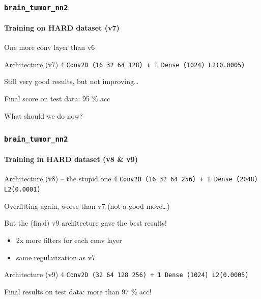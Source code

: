 \documentclass[]{beamer}
\newcommand{\btnt}{\tt{brain\_tumor\_nn2}}
\begin{document}
\begin{frame}
  \frametitle{\btnt}
  \framesubtitle{Training on HARD dataset (v7)}

  One more conv layer than v6

  \begin{exampleblock}{Architecture (v7)}
    4 \tt{Conv2D} (16 32 64 128) + 1 \tt{Dense} (1024) \hfill \alert{L2(0.0005)}
  \end{exampleblock}

  Still very good results, but not improving\ldots{}

  \medskip

  Final score on test data: \alert{95 \% acc}

  \bigskip

  What should we do now?
\end{frame}

\begin{frame}
  \frametitle{\btnt}
  \framesubtitle{Training in HARD dataset (v8 \& v9)}
  \begin{exampleblock}{Architecture (v8) -- the stupid one}
    4 \tt{Conv2D} (16 32 64 256) + 1 \tt{Dense} (2048) \hfill \alert{L2(0.0001)}
  \end{exampleblock}
  \alert{Overfitting} again, worse than v7 (not a good move\ldots{})

  \bigskip

  But the (final) v9 architecture gave the \alert{best results}!
  \begin{itemize}
    \item 2x more filters for each conv layer
    \item same regularization as v7
  \end{itemize}

  \begin{exampleblock}{Architecture (v9)}
    4 \tt{Conv2D} (32 64 128 256) + 1 \tt{Dense} (1024) \hfill \alert{L2(0.0005)}
  \end{exampleblock}

  Final results on test data: more than \alert{97 \% acc}!
\end{frame}
\end{document}
